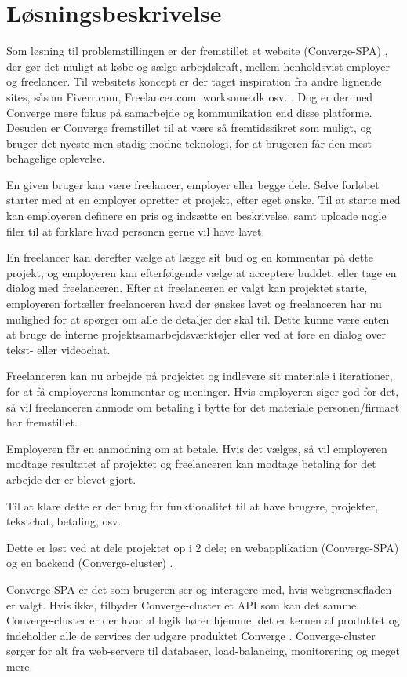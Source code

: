 \section{Løsningsbeskrivelse}

Som løsning til problemstillingen er der fremstillet et website (Converge-SPA) \cite[Converge-SPA]{converge-terms}, der gør det muligt at købe og sælge arbejdskraft, mellem henholdsvist employer og freelancer. Til websitets koncept er der taget inspiration fra andre lignende sites, såsom Fiverr.com, Freelancer.com, worksome.dk osv. \cite[Inspiration sites]{converge-terms}. Dog er der med Converge mere fokus på samarbejde og kommunikation end disse platforme. Desuden er Converge fremstillet til at være så fremtidssikret som muligt, og bruger det nyeste men stadig modne teknologi, for at brugeren får den mest behagelige oplevelse.

En given bruger kan være freelancer, employer eller begge dele. Selve forløbet starter med at en employer opretter et projekt, efter eget ønske. Til at starte med kan employeren definere en pris og indsætte en beskrivelse, samt uploade nogle filer til at forklare hvad personen gerne vil have lavet.

En freelancer kan derefter vælge at lægge sit bud og en kommentar på dette projekt, og employeren kan efterfølgende vælge at acceptere buddet, eller tage en dialog med freelanceren. Efter at freelanceren er valgt kan projektet starte, employeren fortæller freelanceren hvad der ønskes lavet og freelanceren har nu mulighed for at spørger om alle de detaljer der skal til. Dette kunne være enten at bruge de interne projektsamarbejdsværktøjer eller ved at føre en dialog over tekst- eller videochat.

Freelanceren kan nu arbejde på projektet og indlevere sit materiale i iterationer, for at få employerens kommentar og meninger. Hvis employeren siger god for det, så vil freelanceren anmode om betaling i bytte for det materiale personen/firmaet har fremstillet.

Employeren får en anmodning om at betale. Hvis det vælges, så vil employeren modtage resultatet af projektet og freelanceren kan modtage betaling for det arbejde der er blevet gjort.

Til at klare dette er der brug for funktionalitet til at have brugere, projekter, tekstchat, betaling, osv.

Dette er løst ved at dele projektet op i 2 dele; en webapplikation (Converge-SPA) og en backend (Converge-cluster) \cite[Converge-cluster]{converge-terms}.


Converge-SPA er det som brugeren ser og interagere med, hvis webgrænsefladen er valgt. Hvis ikke, tilbyder Converge-cluster et API \cite[API]{converge-terms} som kan det samme. Converge-cluster er der hvor al logik hører hjemme, det er kernen af produktet og indeholder alle de services der udgøre produktet Converge \cite[Converge]{converge-terms}. Converge-cluster sørger for alt fra web-servere til databaser, load-balancing, monitorering og meget mere.